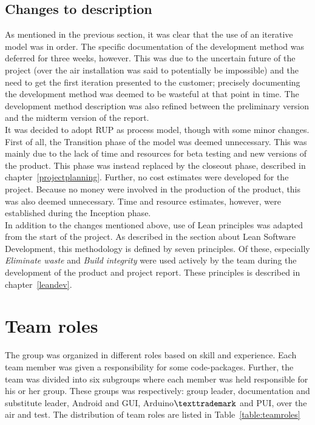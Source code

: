 \subsection{Changes to description}
As mentioned in the previous section, it was clear that the use of an iterative model was in order. The specific documentation of the development method was deferred for three weeks, however. This was due to the uncertain future of the project (over the air installation was said to potentially be impossible) and the need to get the first iteration presented to the customer; precisely documenting the development method was deemed to be wasteful at that point in time. The development method description was also refined between the preliminary version and the midterm version of the report.\\
\newline
It was decided to adopt RUP as process model, though with some minor changes. First of all, the Transition phase of the model was deemed unnecessary. This was mainly due to the lack of time and resources for beta testing and new versions of the product. This phase was instead replaced by the closeout phase, described in chapter~\ref{projectplanning}. Further, no cost estimates were developed for the project. Because no money were involved in the production of the product, this was also deemed unnecessary. Time and resource estimates, however, were established during the Inception phase. \\
\newline
In addition to the changes mentioned above, use of Lean principles was adapted from the start of the project. As described in the section about Lean Software Development, this methodology is defined by seven principles. Of these, especially \emph{Eliminate waste} and \emph{Build integrity} were used actively by the team during the development of the product and project report. These principles is described in chapter~\ref{leandev}.

\section{Team roles}
The group was organized in different roles based on skill and experience. Each team member was given a responsibility for some code-packages. Further, the team was divided into six subgroups where each member was held responsible for his or her group. These groups was respectively: group leader, documentation and substitute leader, Android and GUI, Arduino$\texttrademark$ and PUI, over the air and test.
The distribution of team roles are listed in Table~\ref{table:teamroles}

